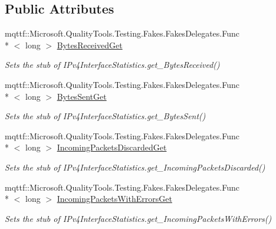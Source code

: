 \subsection*{Public Attributes}
\begin{DoxyCompactItemize}
\item 
mqttf\-::\-Microsoft.\-Quality\-Tools.\-Testing.\-Fakes.\-Fakes\-Delegates.\-Func\\*
$<$ long $>$ \hyperlink{class_system_1_1_net_1_1_network_information_1_1_fakes_1_1_stub_i_pv4_interface_statistics_a0b508994533b665567eedb00b1afb581}{Bytes\-Received\-Get}
\begin{DoxyCompactList}\small\item\em Sets the stub of I\-Pv4\-Interface\-Statistics.\-get\-\_\-\-Bytes\-Received()\end{DoxyCompactList}\item 
mqttf\-::\-Microsoft.\-Quality\-Tools.\-Testing.\-Fakes.\-Fakes\-Delegates.\-Func\\*
$<$ long $>$ \hyperlink{class_system_1_1_net_1_1_network_information_1_1_fakes_1_1_stub_i_pv4_interface_statistics_a4fb84a8b306b3beab4c79e6e297b8747}{Bytes\-Sent\-Get}
\begin{DoxyCompactList}\small\item\em Sets the stub of I\-Pv4\-Interface\-Statistics.\-get\-\_\-\-Bytes\-Sent()\end{DoxyCompactList}\item 
mqttf\-::\-Microsoft.\-Quality\-Tools.\-Testing.\-Fakes.\-Fakes\-Delegates.\-Func\\*
$<$ long $>$ \hyperlink{class_system_1_1_net_1_1_network_information_1_1_fakes_1_1_stub_i_pv4_interface_statistics_a0b5a048c82696a7b617a54380d76f8ae}{Incoming\-Packets\-Discarded\-Get}
\begin{DoxyCompactList}\small\item\em Sets the stub of I\-Pv4\-Interface\-Statistics.\-get\-\_\-\-Incoming\-Packets\-Discarded()\end{DoxyCompactList}\item 
mqttf\-::\-Microsoft.\-Quality\-Tools.\-Testing.\-Fakes.\-Fakes\-Delegates.\-Func\\*
$<$ long $>$ \hyperlink{class_system_1_1_net_1_1_network_information_1_1_fakes_1_1_stub_i_pv4_interface_statistics_a3782f8078041d419016aedb6b9eac3ac}{Incoming\-Packets\-With\-Errors\-Get}
\begin{DoxyCompactList}\small\item\em Sets the stub of I\-Pv4\-Interface\-Statistics.\-get\-\_\-\-Incoming\-Packets\-With\-Errors()\end{DoxyCompactList}\item 

\end{DoxyCompactItemize}

